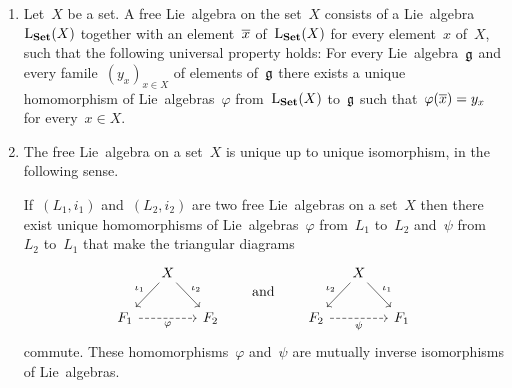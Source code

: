 \begin{remark}
	\label{remarks about free lie algebras}
	\leavevmode
	\begin{enumerate}
		\item
			Let~$X$ be a set.
			A free Lie~algebra on the set~$X$ consists of a Lie~algebra~$\operatorname{L}_{\mathbf{Set}}(X)$ together with an element~$\overline{x}$ of~$\operatorname{L}_{\mathbf{Set}}(X)$ for every element~$x$ of~$X$, such that the following universal property holds:
			For every Lie~algebra~$\mathfrak{g}$ and every famile~$(y_x)_{x \in X}$ of elements of~$\mathfrak{g}$ there exists a unique homomorphism of Lie~algebras~$\varphi$ from~$\operatorname{L}_{\mathbf{Set}}(X)$ to~$\mathfrak{g}$ such that~$\varphi( \overline{x} ) = y_x$ for every~$x \in X$.
		\item
			The free Lie~algebra on a set~$X$ is unique up to unique isomorphism, in the following sense.

			If~$(L_1, i_1)$ and~$(L_2, i_2)$ are two free Lie~algebras on a set~$X$ then there exist unique homomorphisms of Lie~algebras~$\varphi$ from~$L_1$ to~$L_2$ and~$\psi$ from~$L_2$ to~$L_1$ that make the triangular diagrams
			\[
				\begin{tikzcd}[column sep = small]
					{}
					&
					X
					\arrow{dl}[above left]{\iota_1}
					\arrow{dr}[above right]{\iota_2}
					&
					{}
					\\
					F_1
					\arrow[dashed]{rr}[below]{\varphi}
					&
					{}
					&
					F_2
				\end{tikzcd}
				\qquad\text{and}\qquad
				\begin{tikzcd}[column sep = small]
					{}
					&
					X
					\arrow{dl}[above left]{\iota_2}
					\arrow{dr}[above right]{\iota_1}
					&
					{}
					\\
					F_2
					\arrow[dashed]{rr}[below]{\psi}
					&
					{}
					&
					F_1
				\end{tikzcd}
			\]
			commute.
			These homomorphisms~$\varphi$ and~$\psi$ are mutually inverse isomorphisms of Lie~algebras.


\end{enumerate}
\end{remark}

